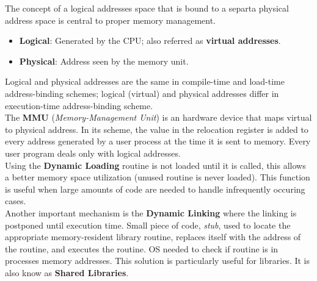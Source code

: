 \documentclass[12pt]{article}
\begin{document}
The concept of a logical addresses space that is bound to a separta physical address space is central to proper memory management.
\begin{itemize}
  \item \textbf{Logical}: Generated by the CPU; also referred as \textbf{virtual addresses}.
  \item \textbf{Physical}: Address seen by the memory unit.
\end{itemize}
Logical and physical addresses are the same in compile-time and load-time address-binding schemes; logical (virtual) and physical addresses differ in execution-time address-binding scheme.\\
The \textbf{MMU} (\textit{Memory-Management Unit}) is an hardware device that maps virtual to physical address. In its scheme, the value in the relocation register is added to every address generated by a user process at the time it is sent to memory. Every user program deals only with logical addresses.\\
Using the \textbf{Dynamic Loading} routine is not loaded until it is called, this allows a better memory space utilization (unused routine is never loaded). This function is useful when large amounts of code are needed to handle infrequently occuring cases.\\
Another important mechanism is the \textbf{Dynamic Linking} where the linking is postponed until execution time. Small piece of code, \textit{stub}, used to locate the appropriate memory-resident library routine, replaces itself with the address of the routine, and executes the routine. OS needed to check if routine is in processes memory addresses. This solution is particularly useful for libraries. It is also know as \textbf{Shared Libraries}.
\end{document}
